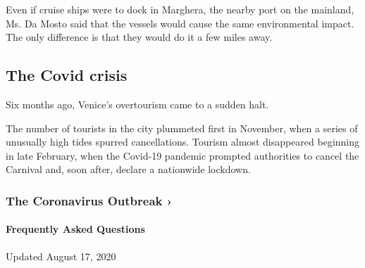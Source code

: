 Even if cruise ships were to dock in Marghera, the nearby port on the
mainland, Ms. Da Mosto said that the vessels would cause the same
environmental impact. The only difference is that they would do it a few
miles away.

\hypertarget{the-covid-crisis}{%
\subsection{The Covid crisis}\label{the-covid-crisis}}

Six months ago, Venice's overtourism came to a sudden halt.

The number of tourists in the city plummeted first in November, when a
series of unusually high tides spurred cancellations. Tourism almost
disappeared beginning in late February, when the Covid-19 pandemic
prompted authorities to cancel the Carnival and, soon after, declare a
nationwide lockdown.

\href{https://www.nytimes3xbfgragh.onion/news-event/coronavirus?action=click\&pgtype=Article\&state=default\&region=MAIN_CONTENT_3\&context=storylines_faq}{}

\hypertarget{the-coronavirus-outbreak-}{%
\subsubsection{The Coronavirus Outbreak
›}\label{the-coronavirus-outbreak-}}

\hypertarget{frequently-asked-questions}{%
\paragraph{Frequently Asked
Questions}\label{frequently-asked-questions}}

Updated August 17, 2020

